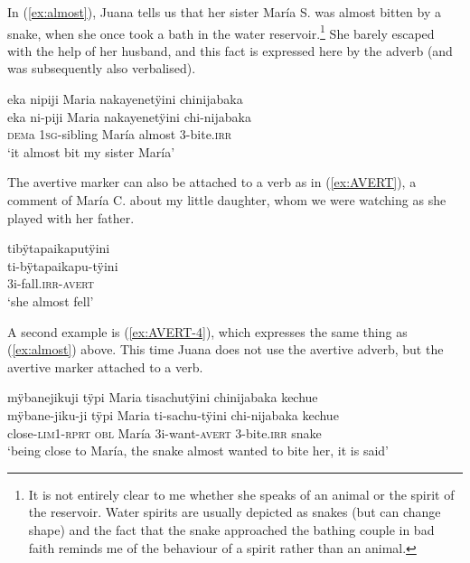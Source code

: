 In (\ref{ex:almost}), Juana tells us that her sister María S. was almost bitten by a snake, when she once took a bath in the water reservoir.\footnote{It is not entirely clear to me whether she speaks of an animal or the spirit of the reservoir. Water spirits are usually depicted as snakes (but can change shape) and the fact that the snake approached the bathing couple in bad faith reminds me of the behaviour of a spirit rather than an animal.}  She barely escaped with the help of her husband, and this fact is expressed here by the adverb (and was subsequently also verbalised). 


\ea\label{ex:almost}
\begingl 
\glpreamble eka nipiji Maria nakayenetÿini chinijabaka\\
\gla eka ni-piji Maria nakayenetÿini chi-nijabaka\\ 
\glb \textsc{dem}a 1\textsc{sg}-sibling María almost 3-bite.\textsc{irr}\\ 
\glft ‘it almost bit my sister María’\\ 
\endgl
\trailingcitation{[jxx-p120515l-2.142]}
\xe

The avertive marker can also be attached to a verb as in (\ref{ex:AVERT}), a comment of María C. about my little daughter, whom we were watching as she played with her father. 

\ea\label{ex:AVERT}
\begingl
\glpreamble tibÿtapaikaputÿini\\
\gla ti-bÿtapaikapu-tÿini\\ 
\glb 3i-fall.\textsc{irr}-\textsc{avert}\\ 
\glft ‘she almost fell’\\ 
\endgl
\trailingcitation{[uxx-p110825l.039]}
\xe

A second example is (\ref{ex:AVERT-4}), which expresses the same thing as (\ref{ex:almost}) above. This time Juana does not use the avertive adverb, but the avertive marker attached to a verb.

\ea\label{ex:AVERT-4}
\begingl
\glpreamble mÿbanejikuji tÿpi Maria tisachutÿini chinijabaka kechue\\
\gla mÿbane-jiku-ji tÿpi Maria ti-sachu-tÿini chi-nijabaka kechue\\
\glb close-\textsc{lim}1-\textsc{rprt} \textsc{obl} María 3i-want-\textsc{avert} 3-bite.\textsc{irr} snake\\
\glft ‘being close to María, the snake almost wanted to bite her, it is said’
\endgl
\trailingcitation{[jxx-p120515l-2.161]}
\xe

